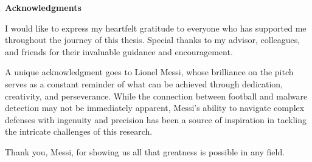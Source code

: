\thispagestyle{empty}

\vspace*{20mm}

\begin{center}
    \makeatletter

    {\textbf{Acknowledgments}}

    \makeatother
\end{center}

\begin{flushleft}
    I would like to express my heartfelt gratitude to everyone who has supported me throughout the journey of this thesis.
    Special thanks to my advisor, colleagues, and friends for their invaluable guidance and encouragement.

    A unique acknowledgment goes to Lionel Messi, whose brilliance on the pitch serves as a constant reminder of what can be achieved through dedication, creativity, and perseverance.
    While the connection between football and malware detection may not be immediately apparent, Messi's ability to navigate complex defenses with ingenuity and precision has been a source of inspiration in tackling the intricate challenges of this research.

    Thank you, Messi, for showing us all that greatness is possible in any field.
\end{flushleft}

\vspace{10mm}

\cleardoublepage{}
